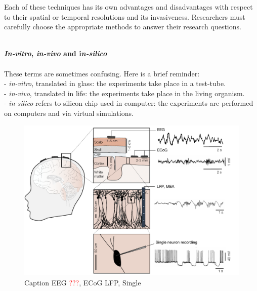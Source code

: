 Each of these techniques has its own advantages and disadvantages with respect to their spatial or temporal resolutions and its invasiveness. Researchers must carefully choose the appropriate methods to answer their research questions. \\~\\
\smallbreak
\noindent
\begin{minipage}{0.45\textwidth}
\begin{lilashaded}
\textbf{\textit{In-vitro}, \textit{in-vivo} and i\textit{n-silico}}\\
~\\
These terms are sometimes confusing. Here is a brief reminder: \\
- \textit{in-vitro}, translated in glass: the experiments take place in a test-tube.\\
- \textit{in-vivo}, translated  in life: the experiments take place in the living organism. \\
- \textit{in-silico} refers to silicon chip used in computer: the experiments are performed on computers and via virtual simulations. 
\end{lilashaded}
\end{minipage}


\newpage
\begin{figure}[h!]
    \centering
    \includegraphics{latex/fig/Intro/Bgd_Recording.pdf}
    \caption{Caption  EEG \textcolor{red}{???}, ECoG \citep{konerding_2018} LFP, Single \citep{steriade_cellular_1995}}
    \label{fig:my_label}
\end{figure}
 



